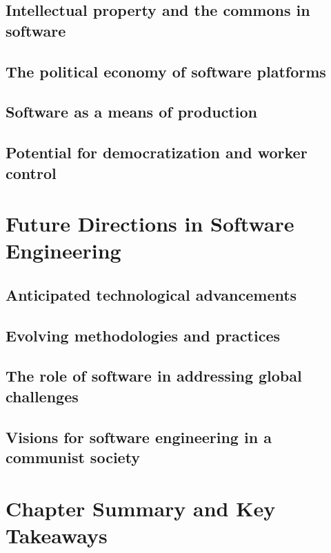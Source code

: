 \subsection{Intellectual property and the commons in software}
\subsection{The political economy of software platforms}
\subsection{Software as a means of production}
\subsection{Potential for democratization and worker control}

\newpage

\section{Future Directions in Software Engineering}
\subsection{Anticipated technological advancements}
\subsection{Evolving methodologies and practices}
\subsection{The role of software in addressing global challenges}
\subsection{Visions for software engineering in a communist society}

\newpage

\section{Chapter Summary and Key Takeaways}